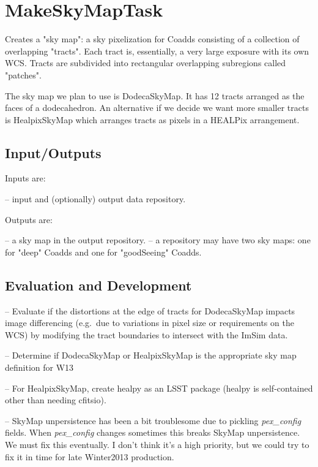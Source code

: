 \documentclass[prd, nofootinbib, floatfix, 11pt,tightenlines,times]{article}
\begin{document}

\section{MakeSkyMapTask} 

Creates a "sky map": a sky pixelization for Coadds consisting of a
collection of overlapping "tracts".  Each tract is, essentially, a
very large exposure with its own WCS.  Tracts are subdivided into
rectangular overlapping subregions called "patches".

The sky map we plan to use is DodecaSkyMap. It has 12 tracts arranged
as the faces of a dodecahedron.  An alternative if we decide we want
more smaller tracts is HealpixSkyMap which arranges tracts as pixels
in a HEALPix arrangement.

\subsection{Input/Outputs}
 Inputs are:

--  input and (optionally) output data repository.

Outputs are:

-- a sky map in the output repository.
-- a repository may have two sky maps: one for "deep" Coadds and one for "goodSeeing" Coadds.

\subsection{Evaluation and Development}

-- Evaluate if the distortions at the edge of tracts for DodecaSkyMap
impacts image differencing (e.g.\ due to variations in pixel size or
requirements on the WCS) by modifying the tract boundaries to
intersect with the ImSim data. 

-- Determine if DodecaSkyMap or HealpixSkyMap is the appropriate sky
map definition for W13

-- For HealpixSkyMap, create healpy as an LSST package (healpy is
self-contained other than needing cfitsio).

-- SkyMap unpersistence has been a bit troublesome due to pickling {\it pex\_config} fields.
When {\it pex\_config} changes sometimes this breaks SkyMap unpersistence. We must fix this eventually.
I don't think it's a high priority, but we could try to fix it in time
for late Winter2013 production.

\end{document}
